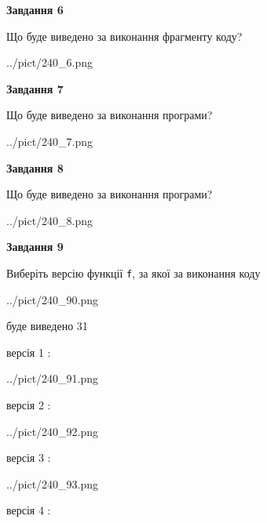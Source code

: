 \documentclass[12pt, ukrainian]{article}
\def\code#1{\Verb!#1!}
\begin{document}
{\begin {large}
{\begin {center}\textbf{Завдання 6}\end {center}}

Що буде виведено за виконання фрагменту коду?\par
\begin{center}
	{../pict/240_6.png}
\end{center}
\newpage

{\begin {center}\textbf{Завдання 7}\end {center}}

Що буде виведено за виконання програми?\par
\begin{center}
	{../pict/240_7.png}
\end{center}
\newpage

{\begin {center}\textbf{Завдання 8}\end {center}}

Що буде виведено за виконання програми?\par
\begin{center}
	{../pict/240_8.png}
\end{center}
\newpage

{\begin {center}\textbf{Завдання 9}\end {center}}

Виберіть версію функції \code{f}, за якої за виконання коду
\begin{center}
	{../pict/240_90.png}
\end{center}
буде виведено 31

\vspace{5mm}
версія 1 :

\begin{center}
	{../pict/240_91.png}
\end{center}
версія 2 :

\begin{center}
	{../pict/240_92.png}
\end{center}
версія 3 :

\begin{center}
	{../pict/240_93.png}
\end{center}
версія 4 :


\end{large}}
\end{document}
